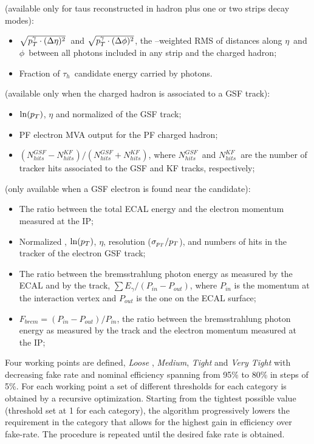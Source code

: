  (available only for taus reconstructed in hadron plus one or two strips decay modes):
\begin{itemize}
\item $\sqrt{p_{T}^{\gamma} \cdot (\Delta\eta)^{2}}$\ and $\sqrt{p_{T}^{\gamma} \cdot (\Delta\phi)^{2}}$, 
  the \pT--weighted RMS of distances along $\eta$\ and $\phi$\ between all photons included in any strip and the charged hadron;
\item Fraction of $\tau_{h}$\ candidate energy carried by photons.
\end{itemize}

 (available only when the charged hadron is associated to a GSF track):
\begin{itemize}
\item $\ln (p_{T})$, $\eta$ and normalized \chisq of the GSF track;
\item PF electron MVA output for the PF charged hadron;
\item $(N_{hits}^{GSF} - N_{hits}^{KF})/(N_{hits}^{GSF} + N_{hits}^{KF})$, where $N_{hits}^{GSF}$\ and $N_{hits}^{KF}$\ are the number of tracker hits associated to the GSF and KF tracks, respectively;
\end{itemize}

 (only available when a GSF electron is found near the candidate):
\begin{itemize}
\item The ratio between the total ECAL energy and the electron momentum measured at the IP;
\item Normalized \chisq, $\ln (p_{T})$, $\eta$, \pT resolution ($\sigma_{p_{T}}/p_{T}$), and numbers of hits in the tracker of the electron GSF track;
\item The ratio between the bremsstrahlung photon energy as measured by the ECAL and by the track, $\sum E_{\gamma}/(P_{in}-P_{out})$, where $P_{in}$ is the momentum at the interaction vertex and $P_{out}$ is the one on the ECAL surface;
\item $F_{brem}=(P_{in}-P_{out})/P_{in}$, the ratio between the bremsstrahlung photon energy as measured by the track and the electron momentum measured at the IP;
\end{itemize}

Four working points are defined, \emph{Loose }, \emph{Medium}, \emph{Tight} and \emph{Very Tight} with decreasing fake rate and nominal efficiency spanning from 95\% to 80\% in steps of 5\%. For each working point a set of different thresholds for each category is obtained by a recursive optimization. Starting from the tightest possible value (threshold set at 1 for each category), the algorithm progressively lowers the requirement in the category that allows for the highest gain in efficiency over fake-rate. The procedure is repeated until the desired fake rate is obtained.

